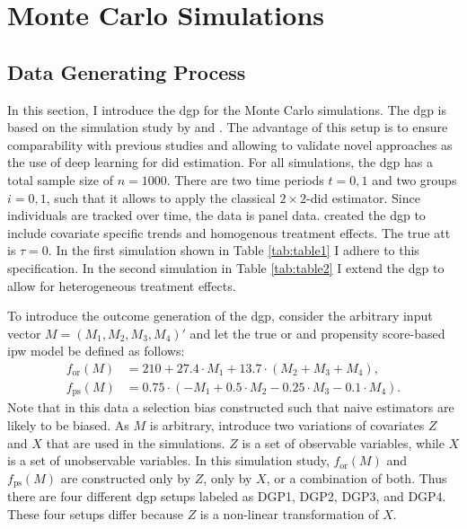 \section{Monte Carlo Simulations}


\subsection{Data Generating Process}

In this section, I introduce the \ac{dgp} for the Monte Carlo simulations.
The \ac{dgp} is based on the simulation study by \citet{kang2007demystifying} and \citet{santannaDoublyRobustDifferenceindifferences2020}.
The advantage of this setup is to ensure comparability with previous studies and allowing to validate novel approaches as the use of deep learning for \ac{did} estimation.
For all simulations, the \ac{dgp} has a total sample size of $n=1000$.
There are two time periods $t=0,1$ and two groups $i=0,1$, such that it allows to apply the classical $2\times2$-\ac{did} estimator.
Since individuals are tracked over time, the data is panel data.
\citet{kang2007demystifying} created the \ac{dgp} to include covariate specific trends and homogenous treatment effects.
The true \ac{att} is $\tau = 0$.
In the first simulation shown in Table \ref{tab:table1} I adhere to this specification. In the second simulation in Table \ref{tab:table2} I extend the \ac{dgp} to allow for heterogeneous treatment effects.

To introduce the outcome generation of the \ac{dgp}, consider the arbitrary input vector $M = (M_1, M_2, M_3, M_4)'$ and let the true \ac{or} and propensity score-based \ac{ipw} model be defined as follows:
\begin{align}
    f_{\text{or}}(M) &= 210 + 27.4 \cdot M_1 + 13.7 \cdot (M_2 + M_3 + M_4), \\
    f_{\text{ps}}(M) &= 0.75 \cdot (-M_1 + 0.5 \cdot M_2 - 0.25 \cdot M_3 - 0.1 \cdot M_4).
\end{align}
Note that in this data a selection bias constructed \citep{kang2007demystifying} such that naive estimators are likely to be biased.
As $M$ is arbitrary, \citet{kang2007demystifying} introduce two variations of covariates $Z$ and $X$ that are used in the simulations.
$Z$ is a set of observable variables, while $X$ is a set of unobservable variables.
In this simulation study, $f_{\text{or}}(M)$ and $f_{\text{ps}}(M)$ are constructed only by $Z$, only by $X$, or a combination of both.
Thus there are four different \ac{dgp} setups labeled as DGP1, DGP2, DGP3, and DGP4.
These four setups differ because $Z$ is a non-linear transformation of $X$.

